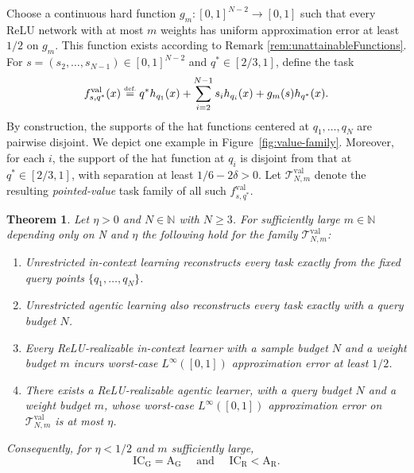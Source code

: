 \documentclass{article}
\newtheorem{theorem}{Theorem}[section]
\newcommand{\eqdef }{\ensuremath{\stackrel{\mbox{\upshape\tiny def.}}{=}}}
\newcommand{\ICG}{\mathrm{IC_G}}
\newcommand{\ICR}{\mathrm{IC_R}}
\newcommand{\AG}{\mathrm{A_G}}
\newcommand{\AR}{\mathrm{A_R}}
\begin{document}
Choose a continuous hard function
$
g_m:[0,1]^{N-2}\to[0,1]
$
such that every ReLU network with at most $m$ weights has uniform approximation error at least
$1/2$ on $g_m$. This function exists according to Remark \ref{rem:unattainableFunctions}.
For $s=(s_2,\dots,s_{N-1})\in[0,1]^{N-2}$ and
$q^\ast\in[2/3,1]$, define the task
\begin{equation}
\label{eq:value-family}
f^{\mathrm{val}}_{s,q^\ast}(x)
\eqdef 
q^\ast h_{q_1}(x)+\sum_{i=2}^{N-1} s_i h_{q_i}(x)+g_m(s)h_{q^\ast}(x).
\end{equation}
By construction, the supports of the hat functions centered at $q_1,\dots,q_N$ are pairwise disjoint. We depict one example in Figure~\ref{fig:value-family}.
Moreover, for each $i$, the support of the hat function at $q_i$ is disjoint from that at $q^\ast\in [2/3,1]$, with separation at least $1/6-2\delta>0$.
Let $\mathcal{T}_{N,m}^{\mathrm{val}}$ denote the resulting \emph{pointed-value} task family of all such $f^{\mathrm{val}}_{s,q^\ast}$.


\begin{theorem}
\label{thm:value}
Let $\eta >0$ and $N \in \mathbb N$ with $N\geq 3$. For sufficiently large $m \in \mathbb N$ depending only on N and $\eta$ the following hold for the family $\mathcal{T}_{N,m}^{\mathrm{val}}$:
\begin{enumerate}
    \item[\rm (i)] Unrestricted in-context learning reconstructs every task exactly from the fixed %
    query points $\{q_1,\dots,q_N\}$.
    \item[\rm (ii)] Unrestricted agentic learning also reconstructs every task exactly with a query budget $N$.
    \item[\rm (iii)] Every ReLU-realizable in-context learner with a sample budget $N$ and a weight budget $m$ %
    incurs worst-case
    $L^\infty([0,1])$ approximation error at least $1/2$. 
    \item[\rm (iv)] There exists a ReLU-realizable agentic learner, with a query budget $N$ and a weight budget $m$, %
    whose worst-case $L^\infty([0,1])$ approximation error on $\mathcal{T}_{N,m}^{\mathrm{val}}$ is at most
    \(\eta\).
\end{enumerate}
Consequently, for \(\eta<1/2\) and $m$ sufficiently large, %
\[
\ICG=\AG
\quad\text{ and }\quad
\ICR<\AR.
\]
\end{theorem}
\end{document}
